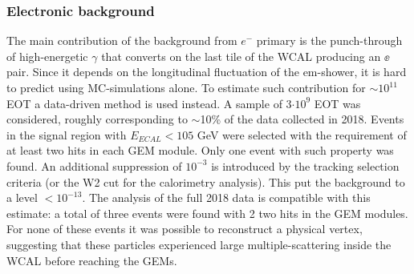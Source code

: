 \subsubsection{Electronic background}
\label{ch3:sec:bkg:vis:elec}

The main contribution of the background from $e^-$ primary is the punch-through of high-energetic $\gamma$ that converts on the last tile of the WCAL producing an $\ee$ pair. Since it depends on the longitudinal fluctuation of the em-shower, it is hard to predict using MC-simulations alone. To estimate such contribution for $\sim10^{11}$ EOT a data-driven method is used instead. A sample of 3$\cdot 10^9$ EOT was considered, roughly corresponding to $\sim$10\% of the data collected in 2018. Events in the signal region with $E_{ECAL} < 105$ GeV were selected with the requirement of at least two hits in each GEM module. Only one event with such property was found. An additional suppression of $10^{-3}$ is introduced by the tracking selection criteria (or the W2 cut for the calorimetry analysis). This put the background to a level $<10^{-13}$. The analysis of the full 2018 data is compatible with this estimate: a total of three events were found with 2 two hits in the GEM modules. For none of these events it was possible to reconstruct a physical vertex, suggesting that these particles experienced large multiple-scattering inside the WCAL before reaching the GEMs.


